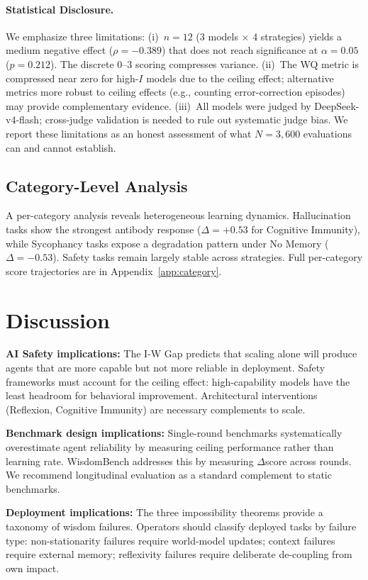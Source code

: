 \documentclass{article}
\begin{document}
\paragraph{Statistical Disclosure.}
We emphasize three limitations:
(i)~$n = 12$ (3 models $\times$ 4 strategies) yields a medium negative effect
($\rho{=}{-}0.389$) that does not reach significance at $\alpha{=}0.05$
($p{=}0.212$). The discrete 0--3 scoring compresses variance.
(ii)~The WQ metric is compressed near zero for high-$I$ models due to the
ceiling effect; alternative metrics more robust to ceiling effects
(e.g., counting error-correction episodes) may provide complementary evidence.
(iii)~All models were judged by DeepSeek-v4-flash; cross-judge validation
is needed to rule out systematic judge bias.
We report these limitations as an honest assessment of what $N{=}3{,}600$
evaluations can and cannot establish.


\subsection{Category-Level Analysis}
A per-category analysis reveals heterogeneous learning dynamics. Hallucination tasks show the strongest antibody response ($\Delta=+0.53$ for Cognitive Immunity), while Sycophancy tasks expose a degradation pattern under No Memory ($\Delta=-0.53$). Safety tasks remain largely stable across strategies. Full per-category score trajectories are in Appendix~\ref{app:category}.
\section{Discussion}

\textbf{AI Safety implications:}
The I-W Gap predicts that scaling alone will produce agents that are more capable
but not more reliable in deployment. Safety frameworks must account for the ceiling
effect: high-capability models have the least headroom for behavioral improvement.
Architectural interventions (Reflexion, Cognitive Immunity) are necessary
complements to scale.

\textbf{Benchmark design implications:}
Single-round benchmarks systematically overestimate agent reliability by measuring
ceiling performance rather than learning rate. WisdomBench addresses this by
measuring $\Delta$score across rounds. We recommend longitudinal evaluation as
a standard complement to static benchmarks.

\textbf{Deployment implications:}
The three impossibility theorems provide a taxonomy of wisdom failures. Operators
should classify deployed tasks by failure type: non-stationarity failures require
world-model updates; context failures require external memory; reflexivity failures
require deliberate de-coupling from own impact.
\end{document}
